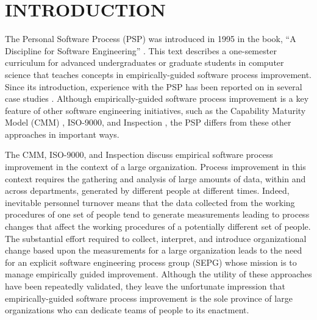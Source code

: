 
\section{INTRODUCTION}

\begin{quotation}
 \cite{Humphrey95}
\end{quotation}

The Personal Software Process (PSP) was introduced in 1995 in the book, ``A
Discipline for Software Engineering'' \cite{Humphrey95}.
This text
describes a one-semester curriculum for advanced undergraduates or graduate
students in computer science that teaches concepts in empirically-guided
software process improvement. Since its introduction, experience with
the PSP has been reported on in several case studies \cite{Ceberio-Verghese96,Ferguson97,Humphrey96,Tomayko96,Humphrey97}.   Although empirically-guided software process
improvement is a key feature of other software engineering initiatives,
such as the Capability Maturity Model (CMM) \cite{Paulk95}, ISO-9000, and
Inspection \cite{Gilb93}, the PSP differs from these other approaches in
important ways.

The CMM, ISO-9000, and Inspection discuss empirical software process
improvement in the context of a large organization.  Process improvement in
this context requires the gathering and analysis of large amounts of data,
within and across departments, generated by different people at different
times.  Indeed, inevitable personnel turnover means that the data collected
from the working procedures of one set of people tend to generate
measurements leading to process changes that affect the working procedures
of a potentially different set of people.  The substantial effort required
to collect, interpret, and introduce organizational change based upon the
measurements for a large organization leads to the need for an explicit
software engineering process group (SEPG) whose mission is to manage
empirically guided improvement. Although the utility of these approaches
have been repeatedly validated, they leave the unfortunate impression that
empirically-guided software process improvement is the sole province of
large organizations who can dedicate teams of people to its enactment.


